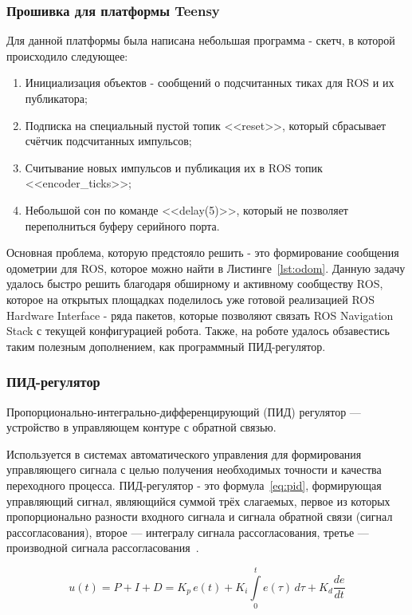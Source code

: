 \subsubsection{Прошивка для платформы Teensy}
Для данной платформы была написана небольшая программа - скетч, в которой происходило следующее:

\begin{enumerate}[beginpenalty=10000] %
  \item Инициализация объектов - сообщений о подсчитанных тиках для ROS и их публикатора;
  \item Подписка на специальный пустой топик <<reset>>, который сбрасывает счётчик подсчитанных импульсов;
  \item Считывание новых импульсов и публикация их в ROS топик <<encoder\_ticks>>; 
  \item Небольшой сон по команде <<delay(5)>>, который не позволяет переполниться буферу серийного порта.
\end{enumerate}

Основная проблема, которую предстояло решить - это формирование сообщения одометрии для ROS, которое можно найти в Листинге~\cref{lst:odom}\cite{odom}. Данную задачу удалось быстро решить благодаря обширному и активному сообществу ROS, которое на открытых площадках поделилось уже готовой реализацией ROS Hardware Interface - ряда пакетов, которые позволяют связать ROS Navigation Stack с текущей конфигурацией робота. Также, на роботе удалось обзавестись таким полезным дополнением, как программный ПИД-регулятор.

\subsubsection{ПИД-регулятор} 
Пропорционально-интегрально-дифференцирующий (ПИД) регулятор — устройство в управляющем контуре с обратной связью. 

Используется в системах автоматического управления для формирования управляющего сигнала с целью получения необходимых точности и качества переходного процесса. ПИД-регулятор - это формула~\cref{eq:pid}, формирующая управляющий сигнал, являющийся суммой трёх слагаемых, первое из которых пропорционально разности входного сигнала и сигнала обратной связи (сигнал рассогласования), второе — интегралу сигнала рассогласования, третье — производной сигнала рассогласования~\cite{pid}. 

\begin{equation}
    \label{eq:pid}
    u(t)=P+I+D=K_{p}\,{e(t)}+K_{i}\int \limits _{0}^{t}{e(\tau )}\,{d\tau }+K_{d}{\frac {de}{dt}}
\end{equation}

